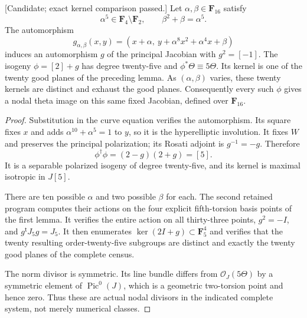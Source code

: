 \begin{proposition}
\label{prop:five-theta-twenty-self-isogenies-candidate}
\textup{[Candidate; exact kernel comparison passed.]}
Let $\alpha,\beta\in\mathbf F_{16}$ satisfy
\[
        \alpha^5\in\mathbf F_4\setminus\mathbf F_2,
        \qquad \beta^2+\beta=\alpha^5.
\]
The automorphism
\[
 g_{\alpha,\beta}(x,y)
   =(x+\alpha,\ y+\alpha^8x^2+\alpha^4x+\beta)
\]
induces an automorphism $g$ of the principal Jacobian with
$g^2=[-1]$. The isogeny $\phi=[2]+g$ has degree twenty-five and
$\phi^*\Theta\equiv5\Theta$. Its kernel is one of the twenty good
planes of the preceding lemma. As $(\alpha,\beta)$ varies, these
twenty kernels are distinct and exhaust the good planes.
Consequently every such $\phi$ gives a nodal theta image on this
same fixed Jacobian, defined over $\mathbf F_{16}$.
\end{proposition}
\begin{proof}
Substitution in the curve equation verifies the automorphism.
Its square fixes $x$ and adds
$\alpha^{10}+\alpha^5=1$ to $y$, so it is the hyperelliptic
involution. It fixes $W$ and preserves the principal polarization;
its Rosati adjoint is $g^{-1}=-g$. Therefore
\[
                 \phi^\dagger\phi=(2-g)(2+g)=[5].
\]
It is a separable polarized isogeny of degree twenty-five, and its
kernel is maximal isotropic in $J[5]$.

There are ten possible $\alpha$ and two possible $\beta$ for each.
The second retained program computes their actions on the four
explicit fifth-torsion basis points of the first lemma. It verifies
the entire action on all thirty-three points, $g^2=-I$, and
$g^{\mathsf t}J_5g=J_5$. It then enumerates
$\ker(2I+g)\subset\mathbf F_5^4$ and verifies that the twenty
resulting order-twenty-five subgroups are distinct and exactly
the twenty good planes of the complete census.

The norm divisor is symmetric. Its line bundle differs from
$\mathcal O_J(5\Theta)$ by a symmetric element of $\operatorname{Pic}^0(J)$,
which is a geometric two-torsion point and hence zero. Thus these
are actual nodal divisors in the indicated complete system,
not merely numerical classes.
\end{proof}

